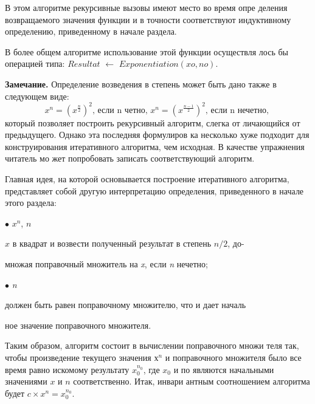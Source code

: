 \parindent=1cm В этом алгоритме рекурсивные вызовы имеют место во время опре­
деления возвращаемого значения функции и в точности соответствуют
индуктивному определению, приведенному в начале раздела.

\parindent=1cm В более общем алгоритме использование этой функции осуществля­
лось бы операцией типа: \textit{$Resultat$} $\leftarrow$ \textit{$Exponentiation(xo,no)$}.
\newline
\begin{center}
\parbox{11cm}
{
\textbf{Замечание.} Определение возведения в степень может быть дано
также в следующем виде:
\begin{equation*}
x^{n} = (x^{ \frac{n}{2} }) ^ {2} \text{, если n четно, } x^{n} = (x^{ \frac{n-1}{2} }) ^ {2}  \text{, если n нечетно, }
\end{equation*}
который позволяет построить рекурсивный алгоритм, слегка от­
личающийся от предыдущего. Однако эта последняя формулиров­
ка несколько хуже подходит для конструирования итеративного
алгоритма, чем исходная. В качестве упражнения читатель мо­
жет попробовать записать соответствующий алгоритм.
}
\end{center}
\parindent=1cm Главная идея, на которой основывается построение итеративного
алгоритма, представляет собой другую интерпретацию определения,
приведенного в начале этого раздела:

\parindent=1cm $\bullet$  \textit{$x^{n}$},  \textit{$n$} 

\parindent=1cm  \textit{$x$} в квадрат и возвести полученный результат в степень \textit{$n/2$}, до-

\parindent=1cm множая поправочный множитель на \textit{x}, если \textit{n} нечетно;

\parindent=1cm $\bullet$  \textit{n} 

\parindent=1cm должен быть равен поправочному множителю, что и дает началь­

\parindent=1cm ное значение поправочного множителя.

\noindent Таким образом, алгоритм состоит в вычислении поправочного множи­
теля так, чтобы произведение текущего значения \textit{$х^{n}$} и поправочного
множителя было все время равно искомому результату \textit{$x_{0}^{n_{0}}$}, где \textit{$x_{0}$} и по
являются начальными значениями \textit{$x$} и \textit{$n$} соответственно. Итак, инвари­
антным соотношением алгоритма будет \textit{$c \times x^{n} = x_0^{n_0}$}.
\pagebreak

